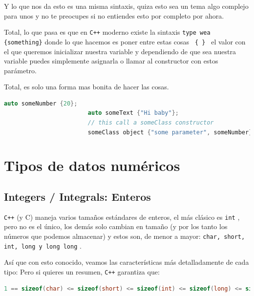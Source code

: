\documentclass[12pt, fleqn]{report}                             %
\theoremstyle{break}                                            %
\newcommand{\textCode}[1]  { \texttt{#1} }                      %
\newcommand \Cpp  {\textCode{C++} }                               %
\begin{document}
                    Y lo que nos da esto es una misma sintaxis, quiza esto sea un tema algo complejo
                    para unos y no te preocupes si no entiendes esto por completo por ahora.

                    Total, lo que pasa es que en \Cpp moderno existe la sintaxis 
                    \textCode{type wea \{something\}} donde lo que hacemos es poner entre estas cosas
                    \textCode{ \{ \} } el valor con el que queremos inicializar nuestra variable y dependiendo
                    de que sea nuestra variable puedes simplemente asignarla o llamar al constructor con estos
                    parámetro.

                    Total, es solo una forma mas bonita de hacer las cosas.

                    \begin{lstlisting}[language=C++, gobble=24]
                        auto someNumber {20};   
                        auto someText {"Hi baby"};
                        // this call a someClass constructor
                        someClass object {"some parameter", someNumber};
                    \end{lstlisting}


        \clearpage
        \section{Tipos de datos numéricos}

            \subsection{Integers / Integrals: Enteros}

                \Cpp (y C) maneja varios tamaños estándares de enteros, el más clásico
                es \textCode{int}, pero no es el único, los demás solo cambian en tamaño
                (y por los tanto los números que podemos almacenar)
                y estos son, de menor a mayor: \textCode{char, short, int, long y long long}.

                Así que con esto conocido, veamos las características más detalladamente de cada tipo:
                Pero si quieres un resumen, \Cpp garantiza que:
                \begin{lstlisting}[language=C++, gobble=20]
                    1 == sizeof(char) <= sizeof(short) <= sizeof(int) <= sizeof(long) <= sizeof(long long);
                \end{lstlisting}
\end{document}
